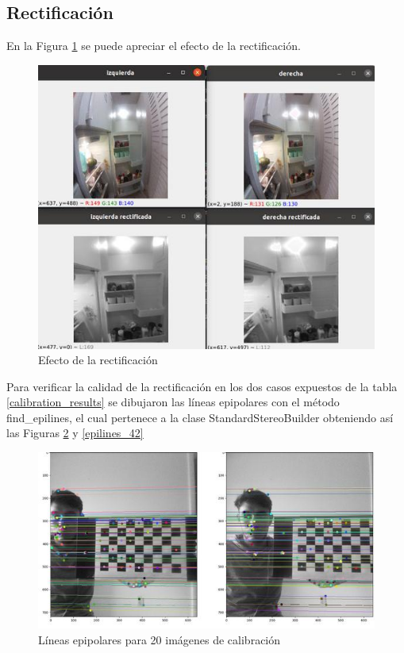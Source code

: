 \subsection{Rectificación}
En la Figura \ref{rectification_result} se puede apreciar el efecto de la rectificación.
\begin{figure}[H]
    \centering
    \includegraphics[scale=0.6]{Recursos/rectification_result.jpg}
    \caption{Efecto de la rectificación}
    \label{rectification_result}
\end{figure}
Para verificar la calidad de la rectificación en los dos casos expuestos de la tabla \ref{calibration_results} se dibujaron las líneas epipolares con el método find\_epilines, el cual pertenece a la clase StandardStereoBuilder obteniendo así las Figuras \ref{epilines_20} y \ref{epilines_42}
\begin{figure}[H]
    \centering
    \includegraphics[scale=0.4]{Recursos/epilines_20_calibration_images.jpg}
    \caption{Líneas epipolares para 20 imágenes de calibración}
    \label{epilines_20}
\end{figure}
